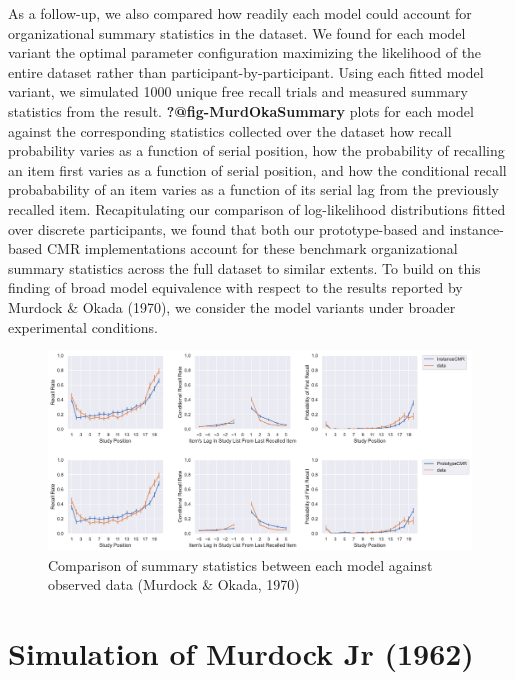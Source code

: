\documentclass[
  letterpaper,
]{article}
\begin{document}
As a follow-up, we also compared how readily each model could account
for organizational summary statistics in the dataset. We found for each
model variant the optimal parameter configuration maximizing the
likelihood of the entire dataset rather than participant-by-participant.
Using each fitted model variant, we simulated 1000 unique free recall
trials and measured summary statistics from the result.
\textbf{?@fig-MurdOkaSummary} plots for each model against the
corresponding statistics collected over the dataset how recall
probability varies as a function of serial position, how the probability
of recalling an item first varies as a function of serial position, and
how the conditional recall probabability of an item varies as a function
of its serial lag from the previously recalled item. Recapitulating our
comparison of log-likelihood distributions fitted over discrete
participants, we found that both our prototype-based and instance-based
CMR implementations account for these benchmark organizational summary
statistics across the full dataset to similar extents. To build on this
finding of broad model equivalence with respect to the results reported
by Murdock \& Okada (1970), we consider the model variants under broader
experimental conditions.

\begin{figure}

{\centering \includegraphics{./figures/overall_murdock1970.pdf}

}

\caption{\label{fig-murdokasummary}Comparison of summary statistics
between each model against observed data (Murdock \& Okada, 1970)}

\end{figure}

\hypertarget{simulation-of-murdock-jr-1962}{%
\section{Simulation of Murdock Jr
(1962)}\label{simulation-of-murdock-jr-1962}}
\end{document}
